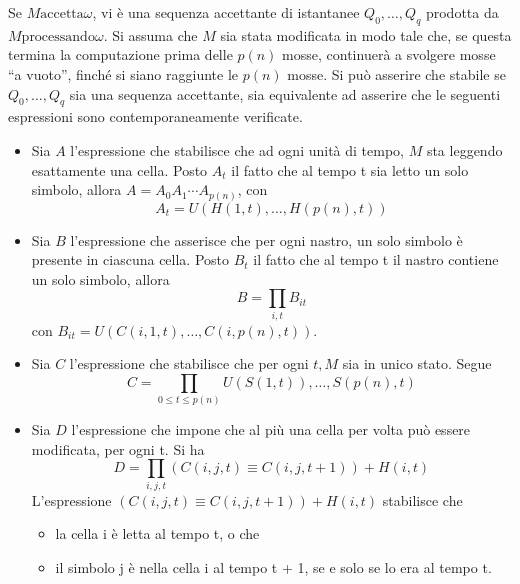 \documentclass{subfiles}
\begin{document}
\begin{Theorem*}[di Cook]
\begin{Proof*}
        \noindent Se \(M \text{accetta} \omega\), vi è una sequenza accettante di istantanee \(Q_{0}, \ldots, Q_{q}\) prodotta da \(M \text{processando} \omega\).
        Si assuma che \(M\) sia stata modificata in modo tale che, se questa termina la computazione prima delle \(p(n)\) mosse, continuerà a svolgere mosse ``a vuoto'',
        finché si siano raggiunte le \(p(n)\) mosse. Si può asserire che stabile se \(Q_{0}, \ldots, Q_{q}\) sia una sequenza accettante,
        sia equivalente ad asserire che le seguenti espressioni sono contemporaneamente verificate.
        \begin{itemize}
            \item Sia \(A\) l'espressione che stabilisce che ad ogni unità di tempo, \(M\) sta leggendo esattamente una cella.
                  Posto \(A_{t}\) il fatto che al tempo t sia letto un solo simbolo, allora \(A = A_{0} A_{1} \cdots A_{p(n)}\), con
                  \[
                      A_{t} = U(H(1, t), \ldots, H(p(n), t))
                  \]
            \item Sia \(B\) l'espressione che asserisce che per ogni nastro, un solo simbolo è presente in ciascuna cella.
                  Posto \(B_{t}\) il fatto che al tempo t il nastro contiene un solo simbolo, allora
                  \[
                      B = \prod\limits_{i, t}{B_{it}}
                  \]
                  con \(B_{it} = U(C(i, 1, t), \ldots, C(i, p(n), t))\).

            \item Sia \(C\) l'espressione che stabilisce che per ogni \(t, M\) sia in unico stato. Segue
                  \[
                      C = \prod\limits_{0 \le t \le p(n)}{U(S(1, t)), \ldots, S(p(n), t)}
                  \]
            \item Sia \(D\) l'espressione che impone che al più una cella per volta può essere modificata, per ogni t. Si ha
                  \[
                      D = \prod\limits_{i, j, t}{(C(i,j, t) \equiv C(i,j, t + 1)) + H(i, t)}
                  \]
                  L'espressione \((C(i,j, t) \equiv C(i,j, t + 1)) + H(i, t)\) stabilisce che
                  \begin{itemize}
                      \item la cella i è letta al tempo t, o che
                      \item il simbolo j è nella cella i al tempo t + 1, se e solo se lo era al tempo t.
                  \end{itemize}


\end{itemize}
\end{Proof*}
\end{Theorem*}
\end{document}

